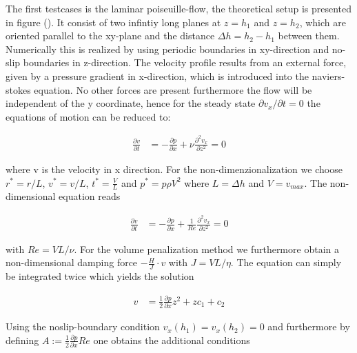 

The first testcases is the laminar poiseuille-flow, the theoretical setup is presented in figure ().
It consist of two infintiy long planes at $z=h_1$ and $z=h_2$, which are oriented parallel to the xy-plane and the distance $\Delta h = h_2 - h_1$ between them.
Numerically this is realized by using periodic boundaries in xy-direction and no-slip boundaries in z-direction.
The velocity profile results from an external force, given by a  pressure gradient in x-direction, which is introduced into the naviers-stokes equation.
No other forces are present furthermore the flow will be independent of the y coordinate,
hence for the steady state $\partial v_x /\partial t = 0$ the equations of motion can be reduced to:

\begin{align}
\frac{\partial v}{\partial t} &= - \frac{\partial p}{\partial x} + \nu \frac{\partial^2 v_x}{\partial z^2} = 0
\end{align}

where v is the velocity in x direction.
For the non-dimenzionalization we choose $r^* = r/L$, $v^*=v/L$, $t^* = \frac{V}{L}$ and $p^* = p \rho V^2$ where $L=\Delta h$ and $V=v_{max}$.
The non-dimensional equation reads

\begin{align}
\frac{\partial v}{\partial t} &= - \frac{\partial p}{\partial x} + \frac{1}{Re} \frac{\partial^2 v_x}{\partial z^2} = 0
\end{align}

with $Re = VL/\nu$.
For the volume penalization method we furthermore obtain a non-dimensional damping force $-\frac{H}{J}\cdot v$ with $J = VL/\eta$.
The equation can simply be integrated twice which yields the solution

\begin{align}
v &= \frac{1}{2}\frac{\partial p}{\partial x}z^2 + zc_1 + c_2
\end{align}

Using the noslip-boundary condition $v_x(h_1) = v_x(h_2) = 0$ and furthermore by defining
$A:=\frac{1}{2}\frac{\partial p}{\partial x} Re$ one obtains the additional conditions

